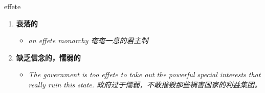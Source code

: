
\begin{frame}
{\huge effete}
\begin{center}
\begin{enumerate}\Large
  \item \textbf{衰落的}
  \begin{itemize}
    \item \em{\Large{an effete monarchy 奄奄一息的君主制}}
  \end{itemize}
  \item \textbf{缺乏信念的，懦弱的}
  \begin{itemize}
    \item \em{\Large{The government is too effete to take out the powerful special interests that really ruin this state. 政府过于懦弱，不敢摧毁那些祸害国家的利益集团。}}
  \end{itemize}
\end{enumerate}
\end{center}
\end{frame}
